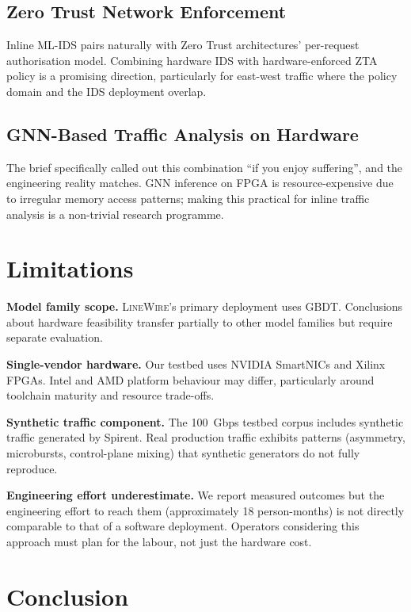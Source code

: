 \documentclass[sigconf,nonacm]{acmart}
\begin{document}
\subsection{Zero Trust Network Enforcement}

Inline ML-IDS pairs naturally with Zero Trust architectures' per-request
authorisation model. Combining hardware IDS with hardware-enforced
ZTA policy is a promising direction, particularly for east-west traffic
where the policy domain and the IDS deployment overlap.

\subsection{GNN-Based Traffic Analysis on Hardware}

The brief specifically called out this combination ``if you enjoy
suffering'', and the engineering reality matches. GNN inference on FPGA
is resource-expensive due to irregular memory access patterns; making
this practical for inline traffic analysis is a non-trivial research
programme.

\section{Limitations}

\textbf{Model family scope.} \textsc{LineWire}'s primary deployment uses
GBDT. Conclusions about hardware feasibility transfer partially to
other model families but require separate evaluation.

\textbf{Single-vendor hardware.} Our testbed uses NVIDIA SmartNICs and
Xilinx FPGAs. Intel and AMD platform behaviour may differ, particularly
around toolchain maturity and resource trade-offs.

\textbf{Synthetic traffic component.} The 100~Gbps testbed corpus
includes synthetic traffic generated by Spirent. Real production
traffic exhibits patterns (asymmetry, microbursts, control-plane mixing)
that synthetic generators do not fully reproduce.

\textbf{Engineering effort underestimate.} We report measured outcomes
but the engineering effort to reach them (approximately 18
person-months) is not directly comparable to that of a software
deployment. Operators considering this approach must plan for the
labour, not just the hardware cost.

\section{Conclusion}
\end{document}
